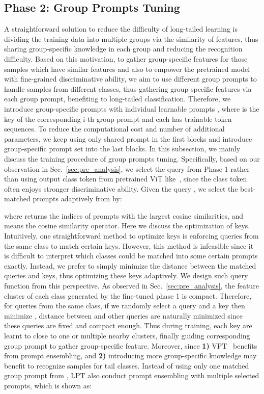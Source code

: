\documentclass{article} \usepackage{iclr2023_conference,times}
\begin{document}
\vspace{-0.3em}
\subsection{Phase 2: Group Prompts Tuning}\label{sec:method_phase2}
\vspace{-0.4em}
A straightforward solution to reduce the difficulty of long-tailed learning is dividing the training data into multiple groups via the similarity of features, thus sharing group-specific knowledge in each group and reducing the recognition difficulty.
Based on this motivation, to gather group-specific features for those samples which have similar features and also to empower the pretrained model with fine-grained discriminative ability,
we aim to use different group prompts to handle samples from different classes, thus gathering group-specific features via each group prompt,  benefiting to long-tailed classification. 
Therefore, we introduce group-specific prompts with  individual learnable prompts
, where  is the key of the corresponding i-th group prompt  and each  has  trainable token sequences. 
To reduce the computational cost and number of additional parameters, we keep using only shared prompt in the first  blocks and introduce group-specific prompt set  into the last  blocks. In this subsection,  we mainly discuss the training procedure of group prompts tuning.
Specifically, based on our observation
 in Sec.~\ref{sec:pre_analysis}, we select the query  from Phase 1 rather than using output class token from pretrained ViT like~\citet{wang2022learning},
since the class token  often enjoys stronger discriminative ability. Given the query , we select the best-matched prompts adaptively from  by:

where  returns the indices of prompts  with the largest  cosine similarities, and  means the cosine similarity operator. 
Here we discuss the optimization of keys. Intuitively, one straightforward method to optimize keys is enforcing queries from the same class to match  certain keys. However, this method is infeasible since it is difficult to interpret which classes could be matched into some certain prompts exactly. Instead, we prefer to simply minimize the distance between the matched queries and keys, thus optimizing these keys adaptively. 
We design such query function from this perspective. 
As observed in Sec.~\ref{sec:pre_analysis}, the feature cluster of each class generated by the fine-tuned phase 1 is compact. 
Therefore, for queries from the same class, if we randomly select a query  and a key  then minimize , distance between  and other queries are naturally minimized since these queries are fixed and compact enough. 
Thus during training, each key are learnt to close to one or multiple nearby clusters, finally guiding corresponding group prompt to gather group-specific feature. 
Moreover, since \textbf{1)} VPT~\citep{jia2022vpt} benefits from prompt ensembling, and \textbf{2)} introducing more group-specific knowledge may benefit to recognize samples for tail classes. Instead of using only one matched group prompt from , LPT also conduct prompt ensembling with multiple selected prompts, which is shown as:
\end{document}
